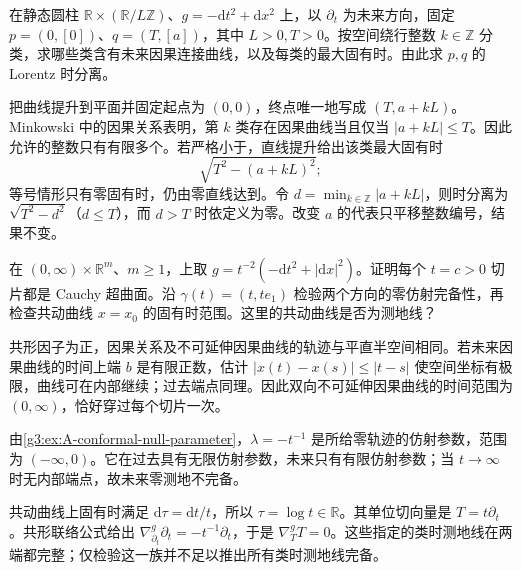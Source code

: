 \begin{exercise}\label{g3:ex:A-cylinder-winding}
	在静态圆柱 \(\mathbb R\times(\mathbb R/L\mathbb Z)\)、\(g=-\mathrm dt^2+\mathrm dx^2\) 上，以 \(\partial_t\) 为未来方向，固定 \(p=(0,[0])\)、\(q=(T,[a])\)，其中 \(L>0,T>0\)。按空间绕行整数 \(k\in\mathbb Z\) 分类，求哪些类含有未来因果连接曲线，以及每类的最大固有时。由此求 \(p,q\) 的 Lorentz 时分离。
\end{exercise}
\begin{solution}
	把曲线提升到平面并固定起点为 \((0,0)\)，终点唯一地写成 \((T,a+kL)\)。Minkowski 中的因果关系表明，第 \(k\) 类存在因果曲线当且仅当 \(|a+kL|\le T\)。因此允许的整数只有有限多个。若严格小于，直线提升给出该类最大固有时
	\[
		\sqrt{T^2-(a+kL)^2};
	\]
	等号情形只有零固有时，仍由零直线达到。令 \(d=\min_{k\in\mathbb Z}|a+kL|\)，则时分离为 \(\sqrt{T^2-d^2}\)（\(d\le T\)），而 \(d>T\) 时依定义为零。改变 \(a\) 的代表只平移整数编号，结果不变。
\end{solution}

\begin{exercise}\label{g3:ex:A-conformal-halfspace}
	在 \((0,\infty)\times\mathbb R^m\)、\(m\ge1\)，上取 \(g=t^{-2}(-\mathrm dt^2+|\mathrm dx|^2)\)。证明每个 \(t=c>0\) 切片都是 Cauchy 超曲面。沿 \(\gamma(t)=(t,t e_1)\) 检验两个方向的零仿射完备性，再检查共动曲线 \(x=x_0\) 的固有时范围。这里的共动曲线是否为测地线？
\end{exercise}
\begin{solution}
	共形因子为正，因果关系及不可延伸因果曲线的轨迹与平直半空间相同。若未来因果曲线的时间上端 \(b\) 是有限正数，估计 \(|x(t)-x(s)|\le|t-s|\) 使空间坐标有极限，曲线可在内部继续；过去端点同理。因此双向不可延伸因果曲线的时间范围为 \((0,\infty)\)，恰好穿过每个切片一次。

	由\cref{g3:ex:A-conformal-null-parameter}，\(\lambda=-t^{-1}\) 是所给零轨迹的仿射参数，范围为 \((-\infty,0)\)。它在过去具有无限仿射参数，未来只有有限仿射参数；当 \(t\to\infty\) 时无内部端点，故未来零测地不完备。

	共动曲线上固有时满足 \(\mathrm d\tau=\mathrm dt/t\)，所以 \(\tau=\log t\in\mathbb R\)。其单位切向量是 \(T=t\partial_t\)。共形联络公式给出 \(\nabla^g_{\partial_t}\partial_t=-t^{-1}\partial_t\)，于是 \(\nabla^g_TT=0\)。这些指定的类时测地线在两端都完整；仅检验这一族并不足以推出所有类时测地线完备。
\end{solution}


